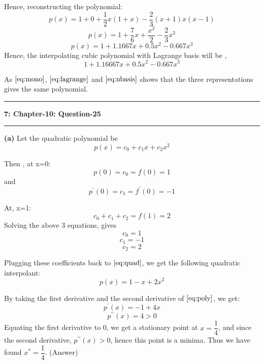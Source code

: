 \documentclass{article}
\newcommand\question[2]{\vspace{.25in}\hrule\textbf{#1: #2}\hrule\vspace{.10in}}
\renewcommand\part[1]{\vspace{.10in}\textbf{(#1)}}
\begin{document}
	Hence, reconstructing the polynomial:
	\[p(x) = 1 + 0 + \dfrac{1}{2}x(1+x) - \dfrac{2}{3}(x+1)x(x-1)\]
	\[p(x) = 1 + \dfrac{7}{6}x + \dfrac{x^2}{2} - \dfrac{2}{3}x^3 \]
	\[p(x) = 1 + 1.1667 x + 0.5 x^2 - 0.667 x^3\]
Hence, the interpolating cubic polynomial with Lagrange basis will be , \newline
\begin{equation}
1 + 1.16667 x + 0.5 x^2 - 0.667x^3 
	\label{eq:nbasis}
\end{equation}

	As $\eqref{eq:mono}$, $\eqref{eq:lagrange}$ and $\eqref{eq:nbasis}$ shows that the three representations gives the same polynomial. \newline


\question{7}{Chapter-10: Question-25}

\part{a} Let the quadratic polynomial be 
\begin{equation}
	p(x) = c_0 + c_1 x + c_2 x^2
	\label{eq:quad}
\end{equation}

Then , at x=0:
\[ p(0) = c_0 = f(0) = 1 \]
and
\[ p^\prime(0) = c_1 = f^\prime(0) = -1\]

At, x=1:
\[ c_0 + c_1 + c_2 = f(1) = 2 \]
Solving the above 3 equations, gives
\[ c_0 = 1\]
\[ c_1 = -1\]
\[ c_2 = 2\]

Plugging these coefficients back to $\eqref{eq:quad}$, we get the following quadratic interpolant:
\begin{equation}
	p(x) = 1 - x + 2x^2
	\label{eq:poly}
\end{equation}

By taking the first derivative and the second derivative of $\eqref{eq:poly}$, we get:
\[p^\prime(x) = -1 + 4x\]
\[p^{\prime\prime}(x) = 4 > 0\]
Equating the first derivative to 0, we get a stationary point at $x=\dfrac{1}{4}$, and since the second derivative, $p^{\prime\prime}(x) > 0$, hence this point is a minima. Thus we have found  $x^* = \dfrac{1}{4}$. (Answer) \newline
\end{document}
